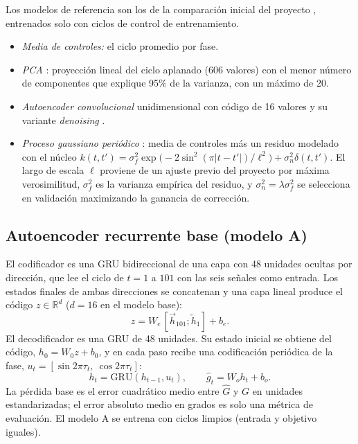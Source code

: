 \documentclass[11pt,a4paper]{amsart}
\newcommand{\R}{\mathbb{R}}
\begin{document}
Los modelos de referencia son los de la comparación inicial del proyecto \cite{neurostride2026}, entrenados solo con ciclos de control de entrenamiento.
\begin{itemize}
\item \textit{Media de controles:} el ciclo promedio por fase.
\item \textit{PCA} \cite{jolliffe2016}: proyección lineal del ciclo aplanado (606 valores) con el menor número de componentes que explique 95\% de la varianza, con un máximo de 20.
\item \textit{Autoencoder convolucional} unidimensional con código de 16 valores \cite{hinton2006} y su variante \textit{denoising} \cite{vincent2008}.
\item \textit{Proceso gaussiano periódico} \cite{rasmussen2006}: media de controles más un residuo modelado con el núcleo $k(t,t')=\sigma_f^2\exp\!\big(-2\sin^2(\pi|t-t'|)/\ell^2\big)+\sigma_n^2\delta(t,t')$. El largo de escala $\ell$ proviene de un ajuste previo del proyecto por máxima verosimilitud, $\sigma_f^2$ es la varianza empírica del residuo, y $\sigma_n^2=\lambda\sigma_f^2$ se selecciona en validación maximizando la ganancia de corrección.
\end{itemize}

\subsection{Autoencoder recurrente base (modelo A)}

El codificador es una GRU bidireccional de una capa con 48 unidades ocultas por dirección, que lee el ciclo de $t=1$ a $101$ con las seis señales como entrada. Los estados finales de ambas direcciones se concatenan y una capa lineal produce el código $z\in\R^{d}$ ($d=16$ en el modelo base):
\begin{equation}
z = W_e\,[\overrightarrow{h}_{101};\overleftarrow{h}_{1}] + b_e .
\end{equation}
El decodificador es una GRU de 48 unidades. Su estado inicial se obtiene del código, $h_0=W_0 z+b_0$, y en cada paso recibe una codificación periódica de la fase, $u_t=[\sin 2\pi\tau_t,\ \cos 2\pi\tau_t]$:
\begin{equation}
h_t=\mathrm{GRU}(h_{t-1},u_t),\qquad \hat g_t = W_o h_t + b_o .
\end{equation}
La pérdida base es el error cuadrático medio entre $\hat G$ y $G$ en unidades estandarizadas; el error absoluto medio en grados es solo una métrica de evaluación. El modelo A se entrena con ciclos limpios (entrada y objetivo iguales).
\end{document}

